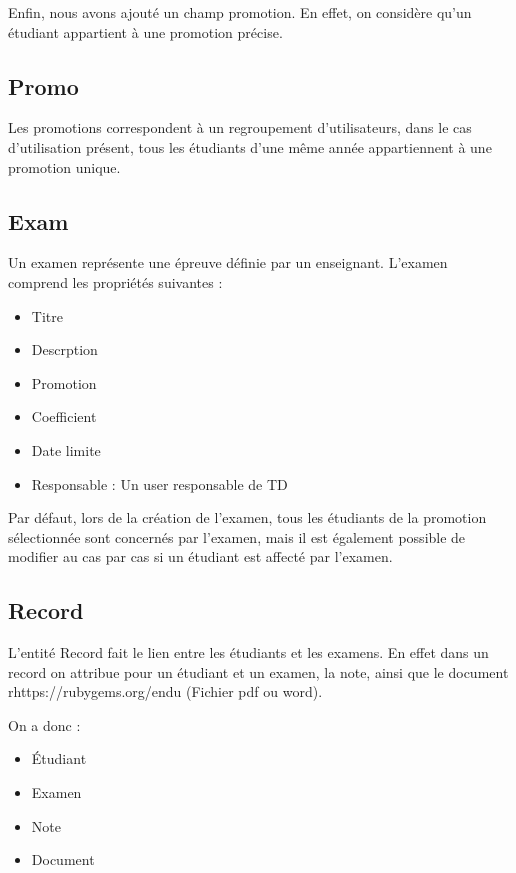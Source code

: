\documentclass{report}
\begin{document}
      Enfin, nous avons ajouté un champ promotion. En effet, on considère 
      qu'un étudiant appartient à une promotion précise.

    \subsection{Promo}
      Les promotions correspondent à un regroupement d'utilisateurs, dans le cas
      d'utilisation présent, tous les étudiants d'une même année appartiennent 
      à une promotion unique.


    \subsection{Exam}
      Un examen représente une épreuve définie par un enseignant. L'examen 
			comprend les propriétés suivantes :
			\begin{itemize}
				\item{Titre}
				\item{Descrption}
				\item{Promotion}
				\item{Coefficient}
				\item{Date limite}
				\item{Responsable : Un user responsable de TD}
      \end{itemize}\vspace{1em}

			Par défaut, lors de la création de l'examen, tous les étudiants de la 
      promotion sélectionnée sont concernés par l'examen, mais il est également 
      possible de modifier au cas par cas si un étudiant est affecté par l'examen.
    \subsection{Record}
			L'entité Record fait le lien entre les étudiants et les examens. En effet
      dans un record on attribue pour un étudiant et un examen, la note, ainsi
      que le document rhttps://rubygems.org/endu (Fichier pdf ou word).

			On a donc :
			\begin{itemize}
				\item{Étudiant}
				\item{Examen}
				\item{Note}
				\item{Document}
      \end{itemize}\vspace{1em}
\end{document}
